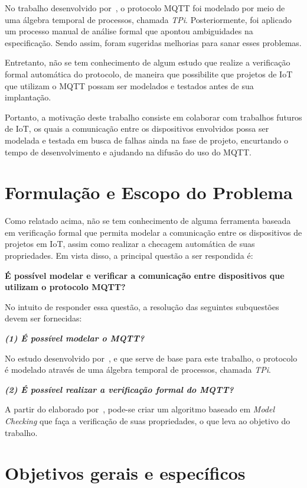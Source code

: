 No trabalho desenvolvido por~\citeauthor{aziz2016formal}, o protocolo MQTT foi modelado por meio de uma álgebra temporal de processos, chamada \textit{TPi}. Posteriormente, foi aplicado um processo manual de análise formal que apontou ambiguidades na especificação. Sendo assim, foram sugeridas melhorias para sanar esses problemas.

Entretanto, não se tem conhecimento de algum estudo que realize a verificação formal automática do protocolo, de maneira que possibilite que projetos de IoT que utilizam o MQTT possam ser modelados e testados antes de sua implantação.

Portanto, a motivação deste trabalho consiste em colaborar com trabalhos futuros de IoT, os quais a comunicação entre os dispositivos envolvidos possa ser modelada e testada em busca de falhas ainda na fase de projeto, encurtando o tempo de desenvolvimento e ajudando na difusão do uso do MQTT.

\section{Formulação e Escopo do Problema}

Como relatado acima, não se tem conhecimento de alguma ferramenta baseada em verificação formal que permita modelar a comunicação entre os dispositivos de projetos em IoT, assim como realizar a checagem automática de suas propriedades. Em vista disso, a principal questão a ser respondida é:

\textbf{É possível modelar e verificar a comunicação entre dispositivos que utilizam o protocolo MQTT?}

No intuito de responder essa questão, a resolução das seguintes subquestões devem ser fornecidas:

\textbf{\textit{(1) É possível modelar o MQTT?}}


No estudo desenvolvido por~\citeauthor{aziz2016formal}, e que serve de base para este trabalho, o protocolo é modelado através de uma álgebra temporal de processos, chamada \textit{TPi}.

\textbf{\textit{(2) É possível realizar a verificação formal do MQTT?}}

A partir do elaborado por~\citeauthor{aziz2016formal}, pode-se criar um algoritmo baseado em \textit{Model Checking} que faça a verificação de suas propriedades, o que leva ao objetivo do trabalho.

\section{Objetivos gerais e específicos}

